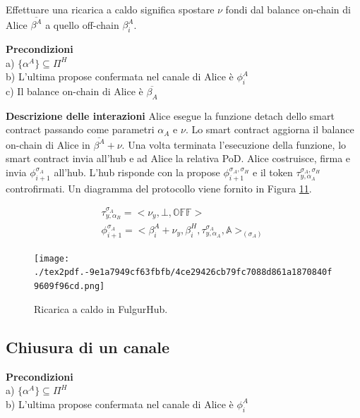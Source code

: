 \documentclass[12pt,italian,]{book}
\begin{document}
Effettuare una ricarica a caldo significa spostare \(\nu\) fondi dal balance on-chain di Alice \(\overline{\beta^A}\) a quello off-chain \(\beta^A_i\).

\textbf{\textbf{Precondizioni}}\\
a) \(\{\alpha^A\} \subseteq \Pi^H\)\\
b) L'ultima propose confermata nel canale di Alice è \(\phi^A_i\)\\
c) Il balance on-chain di Alice è \(\overline{\beta_A}\)

\textbf{\textbf{Descrizione delle interazioni}} Alice esegue la funzione detach dello smart contract passando come parametri \(\alpha_A\) e \(\nu\). Lo smart contract aggiorna il balance on-chain di Alice in \(\overline{\beta^A}+\nu\). Una volta terminata l'esecuzione della funzione, lo smart contract invia all'hub e ad Alice la relativa PoD. Alice costruisce, firma e invia \(\phi^{\sigma_A}_{i+1}\) all'hub. L'hub risponde con la propose \(\phi^{\sigma_A,\sigma_H}_{i+1}\) e il token \(\tau^{\sigma_A,\sigma_H}_{y, \alpha_A}\) controfirmati. Un diagramma del protocollo viene fornito in Figura \protect\hyperlink{caso-duso-ricarica-a-caldo}{11}.

\begin{equation}
\begin{aligned}
\label{Propose detach pagamento OffChain-OffChain}
\tau^{\sigma_A}_{y, \alpha_B} =  <\nu_y, \bot, \mathbb{OFF}>\\
\phi^{\sigma_A}_{i+1} = <\beta^A_i+\nu_y, \beta^H_i, \tau^{\sigma_A}_{y, \alpha_A} ,\mathbb{A}>_(\sigma_A)
\end{aligned}
\end{equation}

\begin{figure}
\centering
\texttt{[image: ./tex2pdf.-9e1a7949cf63fbfb/4ce29426cb79fc7088d861a1870840f9609f96cd.png]}
\caption{\protect\hypertarget{caso-duso-ricarica-a-caldo}{}{}Ricarica a caldo in FulgurHub.}
\end{figure}

\hypertarget{chiusura-di-un-canale}{%
\subsection{Chiusura di un canale}\label{chiusura-di-un-canale}}

\textbf{\textbf{Precondizioni}}\\
a) \(\{\alpha^A\} \subseteq \Pi^H\)\\
b) L'ultima propose confermata nel canale di Alice è \(\phi^A_i\)
\end{document}
